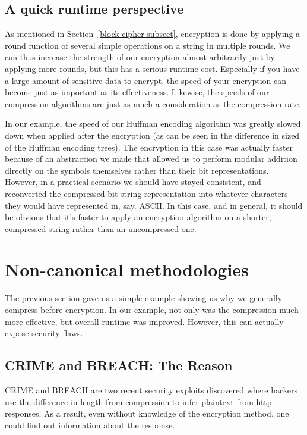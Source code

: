 \documentclass[11pt]{article}
\newcommand\genref{}
\newcommand\sectref{}
\def\genref#1#2{#1~\ref{#2}}
\def\sectref#1{\genref{Section}{#1}}
\begin{document}
\subsection{A quick runtime perspective}\label{runtime-subsect}
As mentioned in \sectref{block-cipher-subsect}, encryption is done by applying a round function of several simple operations 
on a string in multiple rounds. We can thus increase the strength of our encryption almost arbitrarily 
just by applying more rounds, but this has a serious runtime cost. Especially if you have a large amount of sensitive data to 
encrypt, the speed of your encryption can become just as important as its effectiveness. Likewise, the speeds of our 
compression algorithms are just as much a consideration as the compression rate.

In our example, the speed of our 
Huffman encoding algorithm was greatly slowed down when applied after the encryption (as can be seen in the difference in 
sized of the Huffman encoding trees). The encryption in this case was actually faster because of an abstraction we 
made that allowed us to perform modular addition directly on the symbols themselves rather than their bit representations. 
However, in a practical scenario we should have stayed consistent, and reconverted the compressed bit string 
representation into whatever characters they would have 
represented in, say, ASCII. In this case, and in general, it should be obvious that it's faster to apply 
an encryption algorithm on a shorter, compressed string rather than an uncompressed one. 

\section{Non-canonical methodologies}\label{non-canon-sect}
The previous section gave us a simple example showing us why we generally compress before encryption. 
In our example, not only was the compression much more effective, but overall runtime was improved. 
However, this can actually expose security flaws. 

\subsection{CRIME and BREACH: The Reason}\label{crime-breach-subsect}
CRIME and BREACH\cite{kelsey, gluck} are two recent security exploits discovered where hackers use the 
difference in length from compression to infer plaintext from http responses. As a result, even without 
knowledge of the encryption method, one could find out information about the response.
\end{document}
